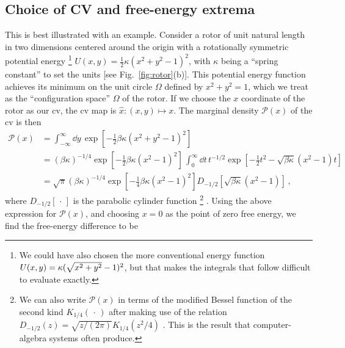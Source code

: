 \begin{subappendices}
\label{sub:subsection name}

\subsection{Choice of CV and free-energy extrema}

This is best illustrated with an example.
Consider a rotor of unit natural length in two dimensions centered around the origin with a rotationally symmetric potential energy%
\footnote{We could have also chosen the more conventional energy function $U(x, y) = \kappa(\smash[b]{\sqrt{x^2 + y^2}} - 1)^2$, but that makes the integrals that follow difficult to evaluate exactly.}
$U(x, y) = \tfrac{1}{2}\kappa(x^2 + y^2 - 1)^2$, with $\kappa$ being a ``spring constant'' to set the units [see Fig.~\ref{fig:rotor}(b)].
This potential energy function achieves its minimum on the unit circle $\Omega$ defined by $x^2 + y^2 = 1$, which we treat as the ``configuration space'' $\Omega$ of the rotor.
If we choose the $x$ coordinate of the rotor as our \ac{cv}, the \ac{cv} map is $\hat{x}: (x,y) \mapsto x$.
The marginal density $\mathscr{P}(x)$ of the \ac{cv} is then
%
\begin{equation}
  \begin{aligned}
    \mathscr{P}(x) &= \int_{-\infty}^{\infty} \dd{y}\, \exp\left[-\tfrac{1}{2}\beta\kappa(x^2 + y^2 - 1)^2\right]\\
                             &= (\beta\kappa)^{-1/4}\exp\left[-\tfrac{1}{2}\beta\kappa(x^2 - 1)^2\right]\,\int_{0}^{\infty} \dd{t}\,t^{-1/2}\exp\left[-\tfrac{1}{2}t^2 - \sqrt{\beta\kappa}(x^2 - 1)t\right]\\
                             &= \sqrt{\pi}(\beta\kappa)^{-1/4}\exp\left[-\tfrac{1}{4}\beta\kappa(x^2 - 1)^2\right]D_{-1/2}\left[\sqrt{\beta\kappa}(x^2 - 1)\right]\,,
                             \label{eq:rotor_pdf}
  \end{aligned}
\end{equation}
%
where $D_{-1/2}[\,\cdot\,]$ is the parabolic cylinder function%
\footnote{We can also write $\mathscr{P}(x)$ in terms of the modified Bessel function of the second kind $K_{1/4}(\,\cdot\,)$ after making use of the relation $D_{-1/2}(z) = \sqrt{z/(2\pi)}K_{1/4}(z^2/4)$ \cite[Eq.~12.7.10]{olver2010}.
This is the result that computer-algebra systems often produce.} \cite[Eq.~12.5.1]{olver2010}.
Using the above expression for $\mathscr{P}(x)$, and choosing $x=0$ as the point of zero free energy, we find the free-energy difference to be
\begin{equation}

\end{equation}
\end{subappendices}

